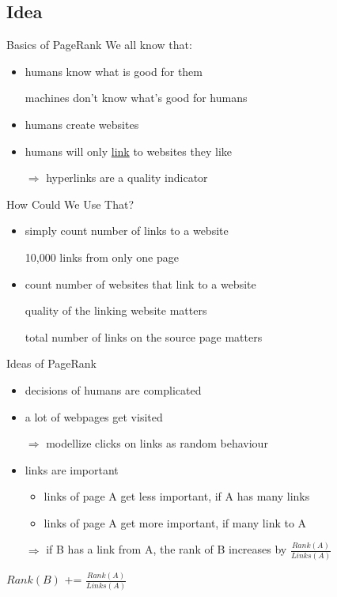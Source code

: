\subsection{Idea}
\begin{frame}{Basics of PageRank}
    We all know that:
    \begin{itemize}[<+->]
        \item humans know what is good for them
        \item[\xmark] machines don't know what's good for humans
        \item humans create websites
        \item humans will only \href{http://en.wikipedia.org/wiki/Hyperlink}{link} to websites they like
        \item[$\Rightarrow$] hyperlinks are a quality indicator
    \end{itemize}
\end{frame}

\begin{frame}{How Could We Use That?}
    \begin{itemize}[<+->]
        \item simply count number of links to a website
        \item[\xmark] 10,000 links from only one page
        \item count number of websites that link to a website
        \item[\xmark] quality of the linking website matters
        \item[\xmark] total number of links on the source page matters
    \end{itemize}
\end{frame}


\begin{frame}{Ideas of PageRank}
    \begin{itemize}[<+->]
        \item decisions of humans are complicated
        \item a lot of webpages get visited
        \item[$\Rightarrow$] modellize clicks on links as random behaviour
        \item links are important
        \begin{itemize}
            \item links of page A get less important, if A has many links
            \item links of page A get more important, if many link to A
        \end{itemize}
        \item[$\Rightarrow$] if B has a link from A, the rank of B increases by $\frac{Rank(A)}{Links(A)}$
    \end{itemize}

    \pause[\thebeamerpauses]

    \begin{algorithmic}
            \State $Rank(B)$ += $\frac{Rank(A)}{Links(A)}$
        \EndIf
    \end{algorithmic}
\end{frame}

